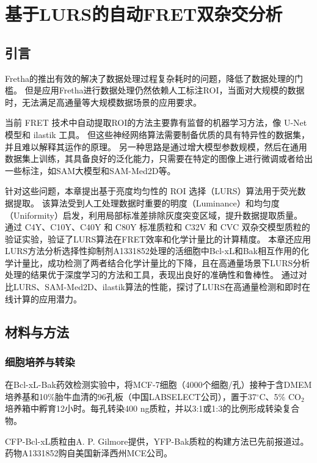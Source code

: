 \chapter{基于LURS的自动FRET双杂交分析}

\section{引言}

\ifshowtext
Fretha的推出有效的解决了数据处理过程复杂耗时的问题，降低了数据处理的门槛。
但是应用Fretha进行数据处理仍然依赖人工标注ROI，当面对大规模的数据时，无法满足高通量等大规模数据场景的应用要求。

当前 FRET 技术中自动提取ROI的方法主要靠有监督的机器学习方法，像 U-Net 模型和 ilastik 工具。
但这些神经网络算法需要制备优质的具有特异性的数据集，并且难以解释其运作的原理。
另一种思路是通过增大模型参数规模，然后在通用数据集上训练，其具备良好的泛化能力，只需要在特定的图像上进行微调或者给出一些标注，如SAM大模型和SAM-Med2D等。

针对这些问题，本章提出基于亮度均匀性的 ROI 选择（LURS）算法用于荧光数据提取。
该算法受到人工处理数据时重要的明度（Luminance）和均匀度（Uniformity）启发，利用局部标准差排除灰度突变区域，提升数据提取质量。
通过 C4Y、C10Y、C40Y 和 C80Y 标准质粒和 C32V 和 CVC 双杂交模型质粒的验证实验，验证了LURS算法在FRET效率和化学计量比的计算精度。
本章还应用LURS方法分析选择性抑制剂A1331852处理的活细胞中Bcl-xL和Bak相互作用的化学计量比，成功检测了两者结合化学计量比的下降，且在高通量场景下LURS分析处理的结果优于深度学习的方法和工具，表现出良好的准确性和鲁棒性。
通过对比LURS、SAM-Med2D、ilastik算法的性能，探讨了LURS在高通量检测和即时在线计算的应用潜力。
\fi

\section{材料与方法}
\subsection{细胞培养与转染}
在Bcl-xL-Bak药效检测实验中，将MCF-7细胞（4000个细胞/孔）接种于含DMEM培养基和10\%胎牛血清的96孔板（中国LABSELECT公司），置于37$^\circ \text{C}$、5\% $\text{CO}_2$培养箱中孵育12小时。每孔转染400 ng质粒，并以3:1或1:3的比例形成转染复合物。

CFP-Bcl-xL质粒由A. P. Gilmore提供，YFP-Bak质粒的构建方法已先前报道过。
药物A1331852购自美国新泽西州MCE公司。


